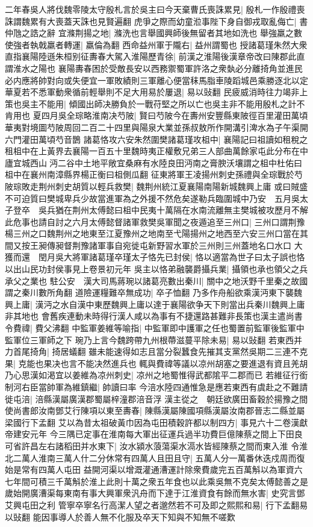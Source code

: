 二年春吳人將伐魏零陵太守殷札言於吳主曰今天棄曹氏喪誅累見|{
	殷札一作殷禮喪誅謂魏累有大喪蓋天誅也見賢遍翻}
虎爭之際而幼童涖事陛下身自御戎取亂侮亡|{
	書仲虺之誥之辭}
宜滌荆揚之地|{
	滌洗也言舉國興師後無留者其地如洗也}
舉強羸之數使強者執戟羸者轉運|{
	羸倫為翻}
西命益州軍于隴右|{
	益州謂蜀也}
授諸葛瑾朱然大衆直指襄陽陸遜朱桓别征夀春大駕入淮陽歷青徐|{
	前漢之淮陽後漢章帝改曰陳郡此直謂淮水之陽也}
襄陽夀春困於受敵長安以西務禦蜀軍許洛之衆埶必分離掎角並進民必内應將帥對向或失便宜一軍敗績則三軍離心便當秣馬脂車陵蹈城邑乘勝逐北以定華夏若不悉軍動衆循前輕舉則不足大用易於屢退|{
	易以䜴翻}
民疲威消時往力竭非上策也吳主不能用|{
	傾國出師决勝負於一戰苻堅之所以亡也吳主非不能用殷札之計不肯用也}
夏四月吳全琮略淮南决芍陂|{
	賢曰芍陂今在夀州安豐縣東陂徑百里灌田萬頃華夷對境圖芍陂周回二百二十四里與陽泉大業並孫叔敖所作開溝引渒水為子午渠開六門灌田萬頃芍音鵲}
諸葛恪攻六安朱然圍樊諸葛瑾攻柤中|{
	襄陽記曰祖讀如租稅之租柤中在上黃界去襄陽一百五十里魏時夷正權敷兄弟三人部曲萬餘家屯此分布在中廬宜城西山沔二谷中土地平敞宜桑麻有水陸良田沔南之膏腴沃壤謂之柤中杜佑曰柤中在襄州南漳縣界楊正衡曰柤側瓜翻}
征東將軍王凌揚州刺史孫禮與全琮戰於芍陂琮敗走荆州刺史胡質以輕兵救樊|{
	魏荆州統江夏襄陽南陽新城魏興上庸}
或曰賊盛不可迫質曰樊城卑兵少故當進軍為之外援不然危矣遂勒兵臨圍城中乃安　五月吳太子登卒　吳兵猶在荆州太傅懿曰柤中民夷十萬隔在水南流離無主樊城被攻歷月不解此危事也請自討之六月太傅懿督諸軍救樊吳軍聞之夜遁追至三州口|{
	三州口謂荆豫楊三州之口魏荆州之地東至江夏豫州之地南至弋陽揚州之地西至六安三州口當在其間又按王昶傳昶督荆豫諸軍事自宛徙屯新野習水軍於三州則三州蓋地名口水口}
大獲而還　閏月吳大將軍諸葛瑾卒瑾太子恪先已封侯|{
	恪以適當為世子曰太子誤也恪以出山民功封侯事見上卷景初元年}
吳主以恪弟融襲爵攝兵業|{
	攝領也承也領父之兵承父之業也}
駐公安　漢大司馬蔣琬以諸葛亮數出秦川|{
	關中之地沃野千里秦之故國謂之秦川數所角翻}
道險運糧難卒無成功|{
	卒子恤翻}
乃多作舟船欲乘漢沔東下襲魏興上庸|{
	漢沔之水自漢中東歷魏興上庸以達于襄陽欲争天下則當出兵秦川魏興上庸非其地也}
會舊疾連動未時得行漢人咸以為事有不捷還路甚難非長策也漢主遣尚書令費禕|{
	費父沸翻}
中監軍姜維等喻指|{
	中監軍即中護軍之任也蜀置前監軍後監軍中監軍位三軍師之下}
琬乃上言今魏跨帶九州根蔕滋蔓平除未易|{
	易以䜴翻}
若東西并力首尾掎角|{
	掎居蟻翻}
雖未能速得如志且當分裂蠶食先摧其支黨然吳期二三連不克果|{
	克能也果决也言不能决然進兵也}
輒與費禕等議以凉州胡塞之要進退有資且羌胡乃心思漢如渇宜以姜維為凉州刺史|{
	凉州之地蜀惟得武都隂平二郡而已}
若維征行銜制河右臣當帥軍為維鎮繼|{
	帥讀曰率}
今涪水陸四通惟急是應若東西有虞赴之不難請徙屯涪|{
	涪縣漢屬廣漢郡蜀屬梓潼郡涪音浮}
漢主從之　朝廷欲廣田畜穀於揚豫之間使尚書郎汝南鄧艾行陳項以東至夀春|{
	陳縣漢屬陳國項縣漢屬汝南郡晉志二縣並屬梁國行下孟翻}
艾以為昔太祖破黃巾因為屯田積穀許都以制四方|{
	事見六十二卷漢獻帝建安元年}
今三隅已定事在淮南每大軍出征運兵過半功費巨億陳蔡之間上下田良可省許昌左右諸稻田并水東下|{
	汝水潁水蒗蕩渠水滆水皆經陳蔡之間而東入淮}
令淮北二萬人淮南三萬人什二分休常有四萬人且田且守|{
	五萬人分一萬番休迭戍周而復始是常有四萬人屯田}
益開河渠以增溉灌通漕運計除衆費歲完五百萬斛以為軍資六七年間可積三千萬斛於淮上此則十萬之衆五年食也以此乘吳無不克矣太傅懿善之是歲始開廣漕渠每東南有事大興軍衆汎舟而下達于江淮資食有餘而無水害|{
	史究言鄧艾興屯田之利}
管寧卒寧名行高潔人望之者邈然若不可及即之熙熙和易|{
	行下孟翻易以䜴翻}
能因事導人於善人無不化服及卒天下知與不知無不嗟歎

